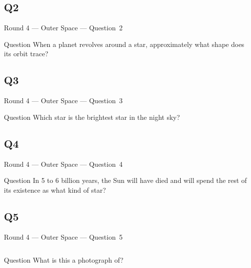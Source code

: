 \documentclass[11pt]{beamer}
\begin{document}
\subsection*{Q2}
\begin{frame}[t]{Round 4 --- Outer Space --- \mbox{Question 2}}
\vspace{-0.5em}
\begin{block}{Question}
When a planet revolves around a star, approximately what shape does its orbit trace?
\end{block}
\end{frame}
\subsection*{Q3}
\begin{frame}[t]{Round 4 --- Outer Space --- \mbox{Question 3}}
\vspace{-0.5em}
\begin{block}{Question}
Which star is the brightest star in the night sky?
\end{block}
\end{frame}
\subsection*{Q4}
\begin{frame}[t]{Round 4 --- Outer Space --- \mbox{Question 4}}
\vspace{-0.5em}
\begin{block}{Question}
In 5 to 6 billion years, the Sun will have died and will spend the rest of its existence as what kind of star?
\end{block}
\end{frame}
\subsection*{Q5}
\begin{frame}[t]{Round 4 --- Outer Space --- \mbox{Question 5}}
\vspace{-0.5em}
\begin{columns}[T,totalwidth=\linewidth]
\begin{column}{0.32\linewidth}
\begin{block}{Question}
What is this a photograph of?
\end{block}
\end{column}
\begin{column}{0.65\linewidth}
\begin{center}
\texttt{[image: \{Images/blackhole]}.png}
\end{center}
\end{column}
\end{columns}
\end{frame}
\end{document}
